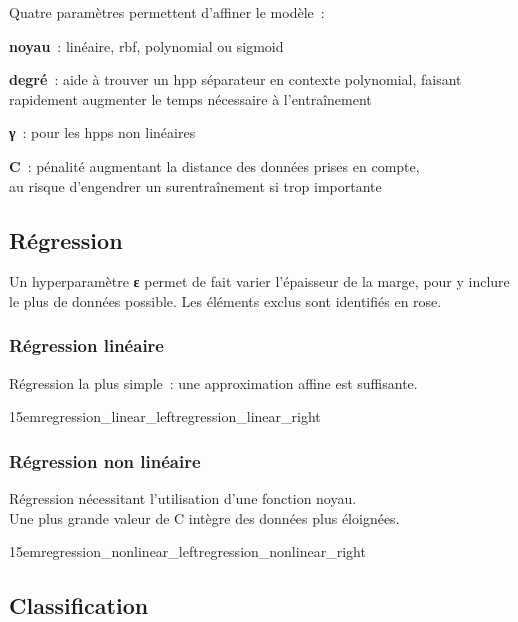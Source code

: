 Quatre paramètres permettent d’affiner le modèle :
\begin{itmz}
\item{\textbf{noyau} : linéaire, \gls{rbf}, polynomial ou \gls{sigmoid}}
\item{\textbf{degré} : aide à trouver un \gls{hpp} séparateur en contexte polynomial,
faisant rapidement augmenter le temps nécessaire à l’entraînement}
\item{\textbf{γ} : pour les \glspl{hpp} non linéaires}
\item{\textbf{C} : pénalité augmentant la distance des données prises en compte,\\
au risque d’engendrer un surentraînement si trop importante}
\end{itmz}

\pagebreak

\subsection{Régression}

Un hyperparamètre \textbf{ε} permet de fait varier l’épaisseur de la marge,
pour y inclure le plus de données possible.
Les éléments exclus sont identifiés en rose.

\subsubsection{Régression linéaire}

Régression la plus simple : une approximation affine est suffisante.

{15em}{regression_linear_left}{regression_linear_right}

\subsubsection{Régression non linéaire}

Régression nécessitant l’utilisation d’une fonction noyau.\\
Une plus grande valeur de C intègre des données plus éloignées.

{15em}{regression_nonlinear_left}{regression_nonlinear_right}

\pagebreak

\subsection{Classification}


